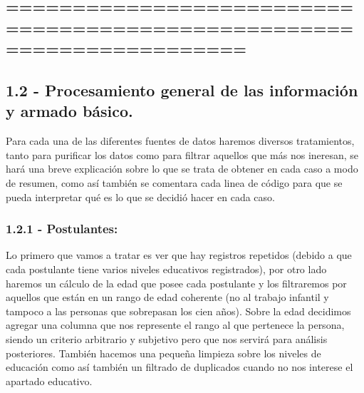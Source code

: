 \documentclass[11pt]{article}
\begin{document}
    \hypertarget{section}{%
\subsection{======================================================================}\label{section}}

\hypertarget{procesamiento-general-de-las-informaciuxf3n-y-armado-buxe1sico.}{%
\subsection{1.2 - Procesamiento general de las información y armado
básico.}\label{procesamiento-general-de-las-informaciuxf3n-y-armado-buxe1sico.}}

Para cada una de las diferentes fuentes de datos haremos diversos
tratamientos, tanto para purificar los datos como para filtrar aquellos
que más nos ineresan, se hará una breve explicación sobre lo que se
trata de obtener en cada caso a modo de resumen, como así también se
comentara cada linea de código para que se pueda interpretar qué es lo
que se decidió hacer en cada caso.

\hypertarget{postulantes}{%
\subsubsection{1.2.1 - Postulantes:}\label{postulantes}}

Lo primero que vamos a tratar es ver que hay registros repetidos (debido
a que cada postulante tiene varios niveles educativos registrados), por
otro lado haremos un cálculo de la edad que posee cada postulante y los
filtraremos por aquellos que están en un rango de edad coherente (no al
trabajo infantil y tampoco a las personas que sobrepasan los cien años).
Sobre la edad decidimos agregar una columna que nos represente el rango
al que pertenece la persona, siendo un criterio arbitrario y subjetivo
pero que nos servirá para análisis posteriores. También hacemos una
pequeña limpieza sobre los niveles de educación como así también un
filtrado de duplicados cuando no nos interese el apartado educativo.
\end{document}
